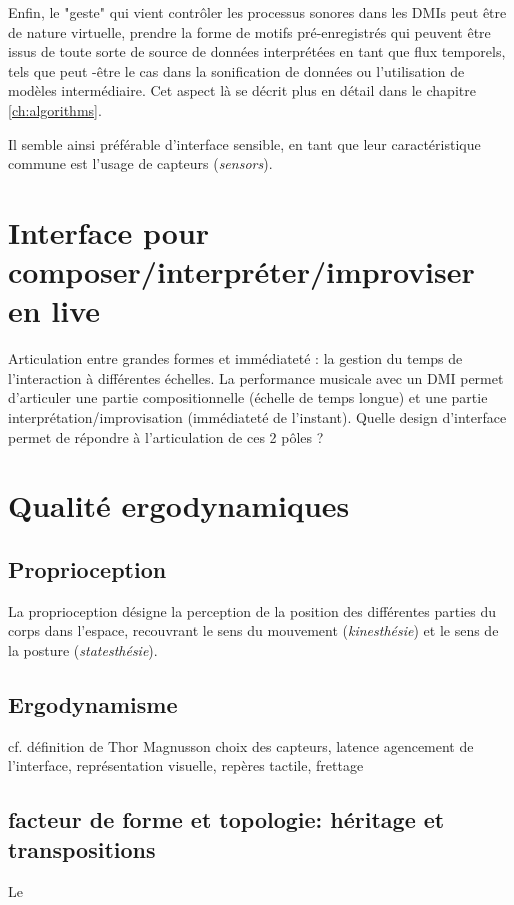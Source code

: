 Enfin, le "geste" qui vient contrôler les processus sonores dans les DMIs peut être de nature virtuelle, prendre la forme de motifs pré-enregistrés qui peuvent être issus de toute sorte de source de données interprétées en tant que flux temporels, tels que peut -être le cas dans la sonification de données ou l'utilisation de modèles intermédiaire. Cet aspect là se décrit plus en détail dans le chapitre \ref{ch:algorithms}.

Il semble ainsi préférable d'interface sensible, en tant que leur caractéristique commune est l'usage de capteurs (\textit{sensors}).

\section{Interface pour composer/interpréter/improviser en live}
Articulation entre grandes formes et immédiateté : la gestion du temps de l’interaction à différentes échelles.
La performance musicale avec un DMI permet d’articuler une partie compositionnelle (échelle de temps longue) et une partie interprétation/improvisation (immédiateté de l’instant). 
Quelle design d’interface permet de répondre à l’articulation de ces 2 pôles ? 

\section{Qualité ergodynamiques}

\subsection{Proprioception}
La proprioception désigne la perception de la position des différentes parties du corps dans l'espace, recouvrant le sens du mouvement (\textit{kinesthésie}) et le sens de la posture (\textit{statesthésie}).
\subsection{Ergodynamisme}
cf. définition de Thor Magnusson
choix des capteurs, latence
agencement de l’interface, représentation visuelle, repères tactile, frettage


\subsection{facteur de forme et topologie: héritage et transpositions}
Le 
